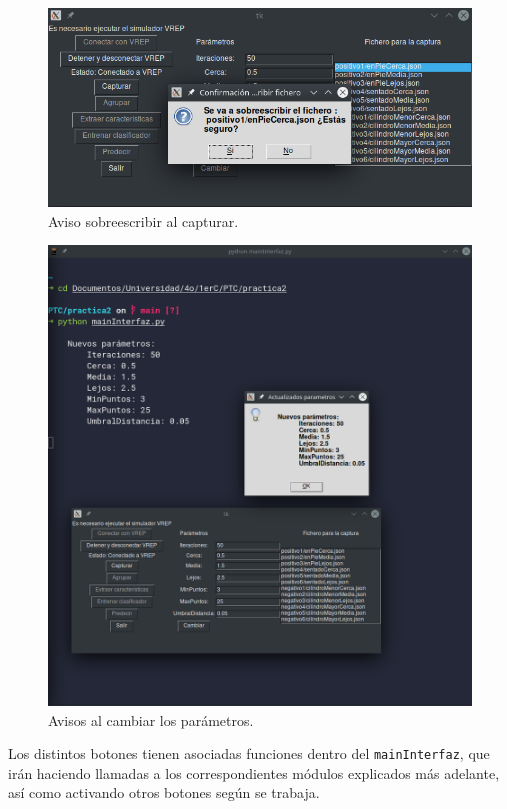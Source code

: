 \documentclass[12pt, spanish]{article}
\begin{document}
\begin{figure}[H]
    \centering
    \includegraphics[width=\textwidth]{creacion_capturar.png}
    \caption{Aviso sobreescribir al capturar.}
\end{figure}

\begin{figure}[H]
    \centering
    \includegraphics[width=\textwidth]{cambio_parametros.png}
    \caption{Avisos al cambiar los parámetros.}
\end{figure}

Los distintos botones tienen asociadas funciones dentro del \texttt{mainInterfaz}, que irán haciendo llamadas a los correspondientes módulos explicados más adelante, así como activando otros botones según se trabaja.
\end{document}
